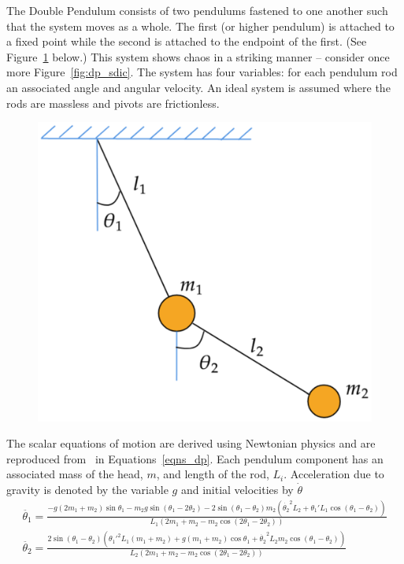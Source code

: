 The Double Pendulum consists of two pendulums fastened to one another such that the system moves as a whole. The first (or higher pendulum) is attached to a fixed point while the second is attached to the endpoint of the first. (See Figure~\ref{fig:dp_setup} below.)
This system shows chaos in a striking manner -- consider once more Figure~\ref{fig:dp_sdic}.
The system has four variables: for each pendulum rod an associated angle and angular velocity. An ideal system is assumed where the rods are massless and pivots are frictionless.
\begin{figure}[ht]
  \includegraphics[width=0.8\linewidth]{Graphs/_dp_setup.eps}
  \centering
\label{fig:dp_setup}
\end{figure}

The scalar equations of motion are derived using Newtonian physics and are reproduced from~\cite{DPFormulas} in Equations~\ref{eqns_dp}. 
Each pendulum component has an associated mass of the head, $m$, and length of the rod, $L_i$. Acceleration due to gravity is denoted by the variable $g$ and initial velocities by $\dot{\theta}$
\begin{eqnarray}\label{eqns_dp}
  \ddot{\theta_{1}}  = \frac{-g(2m_1+m_2)\sin{\theta_1} - m_2g\sin(\theta_1-2\theta_2) - 2\sin(\theta_1-\theta_2)m_2({\dot{\theta_{2}}}^{2}L_2 + {\theta_{1}'}L_1\cos(\theta_1-\theta_2))} {L_1(2m_1 + m_2 -m_2\cos(2\theta_1 - 2\theta_2))}
  \\
  \ddot{\theta_{2}} = \frac{2\sin(\theta_1-\theta_2)(\theta_{1}'^{2}L_1(m_1+m_2) + g(m_1+m_2)\cos\theta_1 + \dot{\theta_{2}}^{2}L_2m_2\cos(\theta_1-\theta_2))}{L_2(2m_1 + m_2 -m_2\cos(2\theta_1 - 2\theta_2))}
\end{eqnarray}

